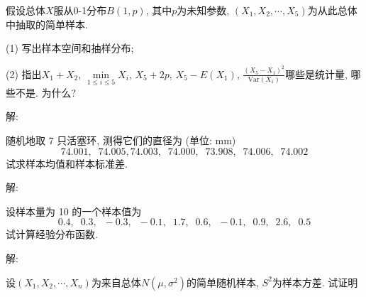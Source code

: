 \documentclass[standard]{ExBook}
\begin{document}
\begin{qitems}
    \begin{bbox}
    \begin{shaded}
        \qitem
假设总体$X$服从0-1分布$B(1,p)$, 其中$p$为未知参数, $(X_1, X_2, \cdots, X_5)$为从此总体中抽取的简单样本.

(1) 写出样本空间和抽样分布;

(2) 指出$X_1+X_2$, $\min\limits_{1 \leq i \leq 5}X_i$, $X_5+2p$, $X_5-E(X_1)$, $\displaystyle\frac{(X_5-X_1)^2}{\text{Var}(X_1)}$哪些是统计量, 哪些不是. 为什么?
    \end{shaded}
    \end{bbox}

\vspace{-5em}

    \begin{bbox}
解: 
    \end{bbox}

\vspace{-5em}

    \begin{bbox}
    \begin{shaded}
        \qitem
随机地取 7 只活塞环, 测得它们的直径为 (单位: mm)
$$74.001, \;\; 74.005, 74.003, \;\; 74.000, \;\; 73.908, \;\; 74.006, \;\; 74.002$$
试求样本均值和样本标准差.
    \end{shaded}
    \end{bbox}

\vspace{-5em}

    \begin{bbox}
解: 
    \end{bbox}

\vspace{-5em}

    \begin{bbox}
    \begin{shaded}
        \qitem
设样本量为 10 的一个样本值为
$$0.4, \;\; 0.3, \;\; -0.3, \;\; -0.1, \;\; 1.7, \;\; 0.6, \;\; -0.1, \;\; 0.9, \;\; 2.6, \;\; 0.5$$
试计算经验分布函数.
    \end{shaded}
    \end{bbox}

\vspace{-5em}

    \begin{bbox}
解: 
    \end{bbox}

\vspace{-5em}

    \begin{bbox}
    \begin{shaded}
        \qitem
设$(X_1, X_2, \cdots, X_n)$为来自总体$N(\mu,\sigma^2)$的简单随机样本, $S^2$为样本方差. 试证明


\end{shaded}
\end{bbox}
\end{qitems}
\end{document}
